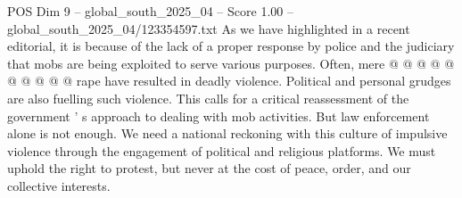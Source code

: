 \begin{textsample}{POS Dim 9 – global\_south\_2025\_04 – Score 1.00 – global\_south\_2025\_04/123354597.txt}
As we have highlighted in a recent editorial, it is because of the lack of a proper response by police and the judiciary that mobs are being exploited to serve various purposes.
Often, mere @ @ @ @ @ @ @ @ @ @ rape have resulted in deadly violence.
Political and personal grudges are also fuelling such violence.
This calls for a critical reassessment of the government ' s approach to dealing with mob activities.
But law enforcement alone is not enough.
We need a national reckoning with this culture of impulsive violence through the engagement of political and religious platforms.
We must uphold the right to protest, but never at the cost of peace, order, and our collective interests.

\end{textsample}
